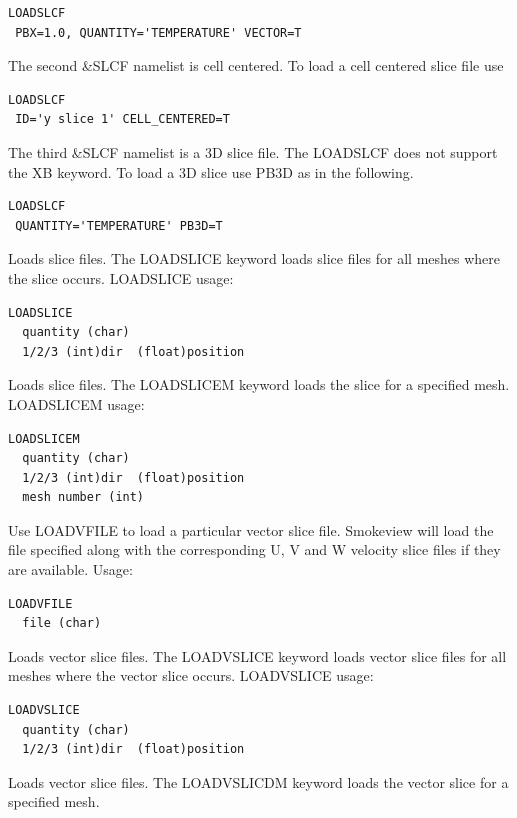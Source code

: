 \documentclass[11pt,twoside]{book}
\begin{document}
\begin{lstlisting}
LOADSLCF
 PBX=1.0, QUANTITY='TEMPERATURE' VECTOR=T
\end{lstlisting}

\noindent The second \&SLCF namelist is cell centered.  To load a cell centered slice file use
\begin{lstlisting}
LOADSLCF
 ID='y slice 1' CELL_CENTERED=T
\end{lstlisting}

The third \&SLCF namelist is a 3D slice file.  The LOADSLCF does not support the XB keyword.
To load a 3D slice use PB3D as in the following.

\begin{lstlisting}
LOADSLCF
 QUANTITY='TEMPERATURE' PB3D=T
\end{lstlisting}

 Loads slice files.  The LOADSLICE keyword loads slice files for
all meshes where the slice occurs.
LOADSLICE usage:
\begin{lstlisting}
LOADSLICE
  quantity (char)
  1/2/3 (int)dir  (float)position
\end{lstlisting}

 Loads slice files.  The LOADSLICEM keyword loads the slice for a specified mesh.
\noindent LOADSLICEM usage:
\begin{lstlisting}
LOADSLICEM
  quantity (char)
  1/2/3 (int)dir  (float)position
  mesh number (int)
\end{lstlisting}

Use LOADVFILE to load a particular vector slice file.  Smokeview will load the file
specified along with the corresponding U, V and W velocity slice files if they are available.
Usage:
\begin{lstlisting}
LOADVFILE
  file (char)
\end{lstlisting}

Loads vector slice files.  The LOADVSLICE keyword loads vector slice files for all meshes where the vector slice occurs.  LOADVSLICE usage:
\begin{lstlisting}
LOADVSLICE
  quantity (char)
  1/2/3 (int)dir  (float)position
\end{lstlisting}

Loads vector slice files.  The LOADVSLICDM keyword loads the vector slice for a specified mesh.
\end{document}
